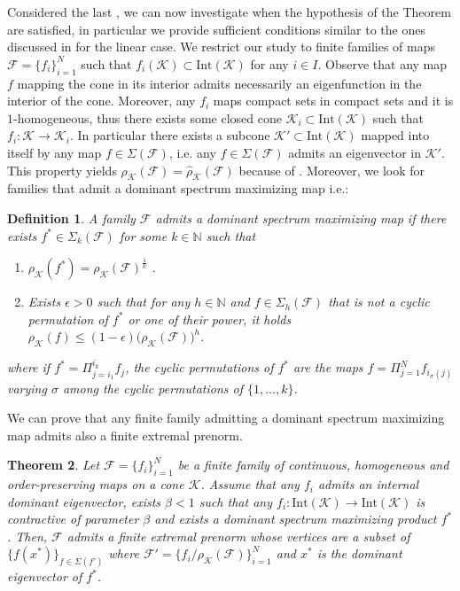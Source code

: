 \documentclass{article}
\newtheorem{theorem}{Theorem}[section]
\newtheorem{definition}[theorem]{Definition}
\newcommand{\N}{\mathbb{N}}
\newcommand{\family}{\mathcal{F}}
\newcommand{\cradius}{\rho_{\cone}}
\newcommand{\cgradius}{\widehat{\rho}_{\cone}}
\newcommand{\cone}{\mathcal{K}}
\newcommand{\interior}{\mathrm{Int}}
\begin{document}
%
%
%
Considered the last , we can now investigate when the hypothesis of the Theorem are satisfied, in particular we provide sufficient conditions similar to the ones discussed in \cite{guglielmi2013exact} for the linear case. We restrict our study to finite families of maps $\family=\{f_i\}_{i=1}^N$ such that $f_i(\cone)\subset \interior(\cone)$ for any $i\in I$.
%
Observe that any map $f$ mapping the cone in its interior admits necessarily an eigenfunction in the interior of the cone.
%
Moreover, any $f_i$ maps compact sets in compact sets and it is $1$-homogeneous, thus there exists 
some closed cone $\cone_i\subset\interior(\cone)$ such that $f_i:\cone\rightarrow \cone_i$. In particular there exists a subcone $\cone'\subset\interior(\cone)$ mapped into itself by any map $f\in \Sigma(\family)$, i.e. any $f\in \Sigma(\family)$ admits an eigenvector in  
$\cone'$. This property yields $\cradius(\family)=\cgradius(\family)$ because of .  
%
Moreover, we look for families that admit a dominant spectrum maximizing map i.e.:
%
\begin{definition}
 A family $\family$ admits a dominant spectrum maximizing map if there exists $f^*\in \Sigma_k(\family)$ for some $k\in \N$ such that 
 \begin{enumerate}
     \item $\cradius(f^*)=\cradius(\family)^\frac{1}{k}$ .
     \item Exists $\epsilon>0$ such that for any $h\in \N$ and $f\in \Sigma_h(\family)$ that is not a cyclic permutation of $f^*$ or one of their power, it holds $\cradius(f)\leq (1-\epsilon) \big(\cradius(\family)\big)^h$. 
 \end{enumerate} 
where if $f^*=\Pi_{j=i_1}^{i_k}f_{j}$, the cyclic permutations of $f^*$ are the maps $f=\Pi_{j=1}^N f_{i_\sigma(j)}$ varying $\sigma$ among the cyclic permutations of $\{1,\dots,k\}$.
\end{definition}
%
We can prove that any finite family admitting a dominant spectrum maximizing map admits also a finite extremal prenorm.
%
\begin{theorem}\label{Thm_Finite_convergence_of_algorithm}
    Let $\family=\{f_i\}_{i=1}^N$ be a finite family of continuous, homogeneous and order-preserving maps on a cone $\cone$. Assume that any $f_i$ admits an internal dominant eigenvector, exists $\beta<1$ such that any $f_i:\interior(\cone)\rightarrow \interior(\cone)$ is contractive of parameter $\beta$ and exists a dominant spectrum maximizing product $f^*$.
    Then, $\family$ admits a finite extremal prenorm whose vertices are a subset of $\{f(x^*)\}_{f\in\Sigma(f')}$ where $\family'=\{f_i/\cradius(\family)\}_{i=1}^N$ and $x^*$ is the dominant eigenvector of $f^*$.
\end{theorem}
\end{document}
